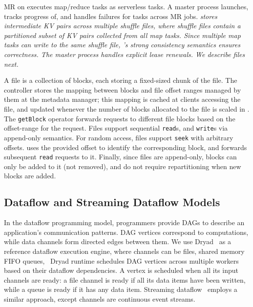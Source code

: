 MR on \jiffy executes map/reduce tasks as serverless tasks. A
master process launches, tracks progress of, and handles failures for 
tasks across MR jobs. \sl stores intermediate
KV pairs across multiple shuffle files, where
shuffle files contain a partitioned subset of KV pairs
collected from all map tasks. Since multiple map tasks can 
write to the same shuffle file, \jiffy's strong consistency 
semantics ensures correctness. The master 
process handles explicit lease renewals. We describe \jiffy files next.

 A \jiffy file is a collection of blocks, each storing a fixed-sized chunk of the file. 
The controller stores the mapping between blocks and
file offset ranges managed by them at the metadata manager;
this mapping is cached at clients accessing the file, and updated
whenever the number of blocks allocated to the file is scaled in \jiffy.
The \texttt{getBlock} operator forwards requests to different file blocks 
based on the offset-range for the request.
Files support sequential \texttt{read}s, and \texttt{write}s via 
append-only semantics. For random access, 
files support \texttt{seek} with arbitrary offsets. 
\jiffy uses the provided offset to identify the corresponding 
block, and forwards subsequent \texttt{read}
requests to it. Finally, since files are append-only, blocks 
can only be added to it (not removed), and do not require 
repartitioning when new blocks are added. %

\subsection{Dataflow and Streaming Dataflow Models}
\label{ssec:dflow}

In the dataflow programming model, programmers provide DAGs to describe 
an application's communication patterns. DAG vertices correspond to computations,
while data channels form directed edges between them. We use
Dryad~\cite{dryad} as a reference dataflow execution engine, where 
channels can be files, shared memory FIFO queues, \etc~Dryad runtime 
schedules DAG vertices across multiple workers based on their 
dataflow dependencies. A vertex is scheduled when 
all its input channels are ready: a file channel is ready if all its data 
items have been written, while a queue is ready if it has any data item. 
Streaming dataflow~\cite{streamscope} employs a similar
approach, except channels are continuous event streams.

